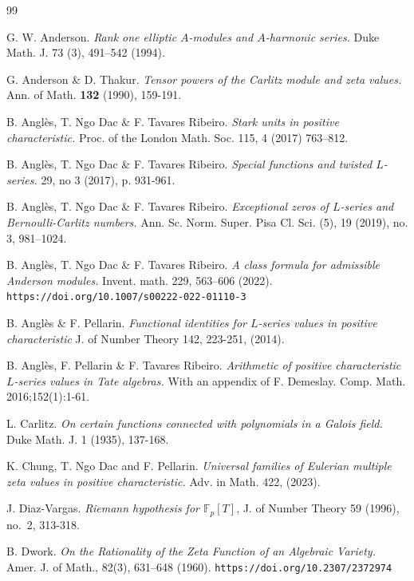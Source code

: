 \documentclass[11pt]{amsart}
\numberwithin{equation}{section}
\begin{document}
\begin{thebibliography}{99}

 G. W. Anderson. {\em Rank one elliptic $A$-modules and $A$-harmonic series.}
Duke Math. J. 73 (3), 491--542 (1994).

 G. Anderson \& D. Thakur. {\em Tensor powers of the Carlitz module and zeta values.} Ann. of Math. {\bf 132} (1990), 159-191.

 B. Angl\`es, T. Ngo Dac \& F. Tavares Ribeiro. {\em Stark units in positive characteristic.} Proc. of the London Math. Soc. 115, 4 (2017) 763--812.

 B. Angl\`es, T. Ngo Dac \& F. Tavares Ribeiro. {\em Special functions and twisted $L$-series.}
29, no 3 (2017), p. 931-961.

 B. Angl\`es, T. Ngo Dac \& F. Tavares Ribeiro. {\em Exceptional zeros of $L$-series and Bernoulli-Carlitz numbers.} Ann. Sc. Norm. Super. Pisa Cl. Sci. (5), 19 (2019), no. 3, 981--1024.

 B. Angl\`es, T. Ngo Dac \& F. Tavares Ribeiro. {\em A class formula for admissible Anderson modules.} Invent. math. 229, 563--606 (2022). {\tt https://doi.org/10.1007/s00222-022-01110-3}

 B. Angl\`es \& F. Pellarin. {\em Functional identities for $L$-series values in positive characteristic} 
J. of Number Theory 142, 223-251, (2014).

 B. Angl\`es, F. Pellarin \& F. Tavares Ribeiro. {\em Arithmetic of positive characteristic $L$-series values in Tate algebras.} With an appendix of F. Demeslay. Comp. Math. 2016;152(1):1-61. 

 L. Carlitz. {\em On certain functions connected with polynomials in a Galois field.} Duke Math. J. 1 (1935), 137-168.

 K. Chung, T. Ngo Dac and F. Pellarin. {\em Universal families of Eulerian multiple zeta values in positive characteristic.} Adv. in Math. 422, (2023).

 J. Diaz-Vargas. {\em Riemann hypothesis for $\mathbb{F}_{p}[T]$}, J. of Number Theory 59 (1996), no.~2, 313-318.

 B. Dwork. {\em On the Rationality of the Zeta Function of an Algebraic Variety.} Amer. J. of Math., 82(3), 631--648  (1960). {\tt https://doi.org/10.2307/2372974}


\end{thebibliography}
\end{document}
